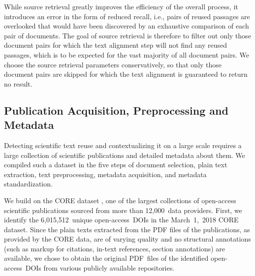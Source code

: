 \documentclass[fleqn,10pt]{wlscirep}
\begin{document}
While source retrieval greatly improves the efficiency of the overall process, it introduces an error in the form of reduced recall, i.e., pairs of reused passages are overlooked that would have been discovered by an exhaustive comparison of each pair of documents. The goal of source retrieval is therefore to filter out only those document pairs for which the text alignment step will not find any reused passages, which is to be expected for the vast majority of all document pairs. We choose the source retrieval parameters conservatively, so that only those document pairs are skipped for which the text alignment is guaranteed to return no result.


\subsection*{Publication Acquisition, Preprocessing and Metadata}\label{sub:data}

Detecting scientific text reuse and contextualizing it on a large scale requires a large collection of scientific publications and detailed metadata about them. We compiled such a dataset in the five steps of document selection, plain text extraction, text preprocessing, metadata acquisition, and metadata standardization.

We build on the CORE dataset \cite{knoth:2012}, one of the largest collections of open-access scientific publications sourced from more than 12,000~data providers. First, we identify the 6,015,512~unique open-access~DOIs in the March~1,~2018 CORE dataset. Since the plain texts extracted from the PDF files of the publications, as provided by the CORE data, are of varying quality and no structural annotations (such as markup for citations, in-text references, section annotations) are available, we chose to obtain the original PDF~files of the identified open-access~DOIs from various publicly available repositories.
\end{document}
